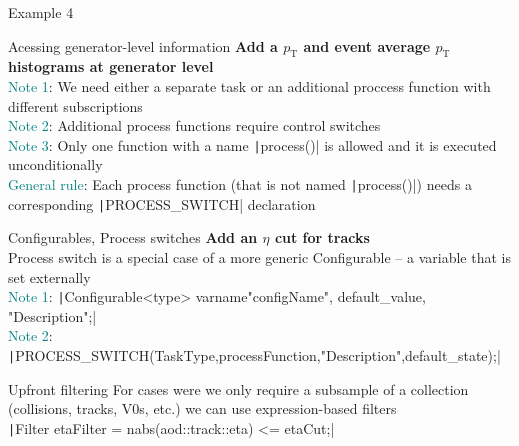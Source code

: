 \documentclass[10pt,lualatex,xcolor={table,svgnames},{hyperref={bookmarks=true,linktoc=all}},aspectratio=169]{beamer}
\newcommand{\programmatic}[1]{\textcolor{-green!40!yellow}{#1}}
\newcommand{\notion}[1]{\textcolor{teal}{#1}}
\newcommand{\codelines}[2]{{\texttt|#1|}}
\newcommand{\codeline}[1]{{\texttt|#1|}}
\begin{document}
\begin{frame}{Example 4}
\begin{block}{Acessing generator-level information}
\textbf{Add a $p_{\text{T}}$ and event average $p_{\text{T}}$ histograms at generator level} \\[1em]
\notion{Note 1}: We need either a separate task or an additional proccess function with different subscriptions \\
\notion{Note 2}: Additional process functions require control switches \\
\notion{Note 3}: Only one function with a name \codeline{process()} is allowed and it is executed unconditionally \\
\notion{General rule}: Each process function (that is not named \codeline{process()}) needs a corresponding \codeline{PROCESS_SWITCH} declaration
\end{block}
\begin{block}{Configurables, Process switches}
\textbf{Add an $\eta$ cut for tracks} \\[1em]
\programmatic{Process switch} is a special case of a more generic \programmatic{Configurable} -- a variable that is set externally \\
\notion{Note 1}: \codeline{Configurable<type> varname{"configName", default_value, "Description"};} \\
\notion{Note 2}: \codeline{PROCESS_SWITCH(TaskType,processFunction,"Description",default_state);} \\
\end{block}
\framebreak
\begin{block}{Upfront filtering}
For cases were we only require a subsample of a collection (collisions, tracks, V0s, etc.) we can use expression-based filters \\

\codelines{Filter etaFilter = nabs(aod::track::eta) <= etaCut;}{\footnotesize}


\end{block}
\end{frame}
\end{document}
